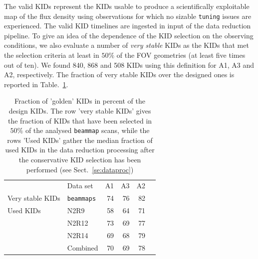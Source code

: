 The valid KIDs represent the KIDs
usable to produce a scientifically exploitable map of the flux
density using observations for which no sizable {\tt tuning}
issues are experienced. {\lp The valid KID timelines are ingested in
input of the data reduction pipeline. To give an idea of the
dependence of the KID selection on the observing conditions,} we also
evaluate a number of \emph{very stable} KIDs as the KIDs that met the
selection criteria at least in {\lp $50\%$} of the FOV geometries (at least
five times out of {\lp ten}). We
found 840, 868 and 508 KIDs using this definition for A1, A3 and A2,
respectively. The fraction of very stable KIDs over the designed ones
is reported in Table.~\ref{tab:eta_used}.

\begin{table}[!htbp]
  \centering
  \caption[]{Fraction of 'golden' KIDs in percent of the design
  KIDs. The row 'very stable KIDs' gives the fraction of KIDs that have been selected
  in {\lp $50\%$} of the analysed {\tt beammap} scans, while the rows 'Used KIDs' gather
  the median fraction of used KIDs in the data reduction processing
  after the conservative KID selection has been performed (see Sect.~\ref{se:dataproc})}
  \label{tab:eta_used}
  \begin{tabular}{llrrrr}
    \hline\hline
    \noalign{\smallskip}
    &  Data set   & A1      &   A3    &     A2 \\
    \noalign{\smallskip}
    \hline
    \noalign{\smallskip}
    Very stable KIDs & {\tt beammaps} & 74  &  76  &  82  \\
    \hline
    \noalign{\smallskip}
    Used KIDs  & N2R9     & 58 &  64  & 71 \\
               & N2R12    & 73 &  69  & 77 \\
               & N2R14    & 69 &  68  & 79 \\
               & Combined & 70 &  69  & 78 \\
    \hline
  \end{tabular}
\end{table}

